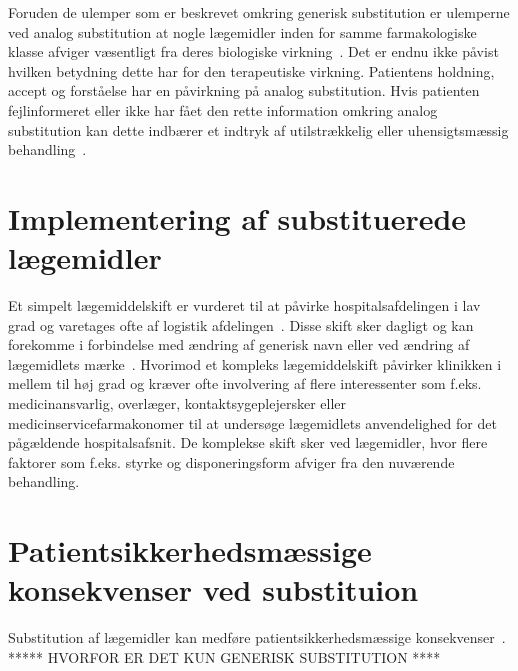 Foruden de ulemper som er beskrevet omkring generisk substitution er ulemperne ved analog substitution at nogle lægemidler inden for samme farmakologiske klasse afviger væsentligt fra deres biologiske virkning~\citep{Kairi2017}. Det er endnu ikke påvist hvilken betydning dette har for den terapeutiske virkning. Patientens holdning, accept og forståelse har en påvirkning på analog substitution. Hvis patienten fejlinformeret eller ikke har fået den rette information omkring analog substitution kan dette indbærer et indtryk af utilstrækkelig eller uhensigtsmæssig behandling~\citep{Kairi2017}.
 

\section{Implementering af substituerede lægemidler}
Et simpelt lægemiddelskift er vurderet til at påvirke hospitalsafdelingen i lav grad og varetages ofte af logistik afdelingen~\citep{Laegemiddelinformaion2017, Sygehusapoteket2017a}. Disse skift sker dagligt og kan forekomme i forbindelse med ændring af generisk navn eller ved ændring af lægemidlets mærke~\citep{Sygehusapoteket2017a, Kairi2017}. Hvorimod et kompleks lægemiddelskift påvirker klinikken i mellem til høj grad og kræver ofte involvering af flere interessenter som f.eks. medicinansvarlig, overlæger, kontaktsygeplejersker eller medicinservicefarmakonomer til at undersøge lægemidlets anvendelighed for det pågældende hospitalsafsnit. 
De komplekse skift sker ved lægemidler, hvor flere faktorer som f.eks. styrke og disponeringsform afviger fra den nuværende behandling.~\citep{Laegemiddelinformaion2017,Sygehusapoteket2017a}

\section{Patientsikkerhedsmæssige konsekvenser ved substituion} \label{sec:ProblemLaeg}
Substitution af lægemidler kan medføre patientsikkerhedsmæssige konsekvenser~\citep{DanskSelskabforPatientsikkerhed2009}. ***** HVORFOR ER DET KUN GENERISK SUBSTITUTION ****




